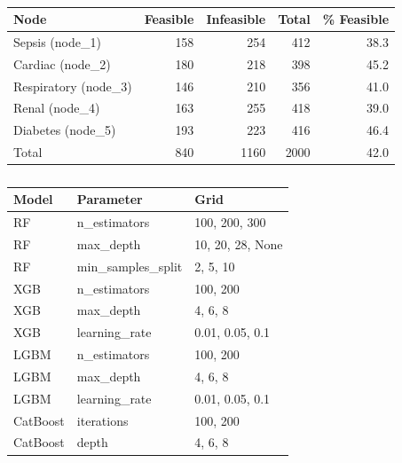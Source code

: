 
\begin{table}[h]
\begin{englishblock}
\centering
\caption{}
\begin{tabular}{lrrrr}
\toprule
Node & Feasible & Infeasible & Total & \% Feasible \\
\midrule
Sepsis (node\_1) & 158 & 254 & 412 & 38.3 \\
Cardiac (node\_2) & 180 & 218 & 398 & 45.2 \\
Respiratory (node\_3) & 146 & 210 & 356 & 41.0 \\
Renal (node\_4) & 163 & 255 & 418 & 39.0 \\
Diabetes (node\_5) & 193 & 223 & 416 & 46.4 \\
\midrule
Total & 840 & 1160 & 2000 & 42.0 \\
\bottomrule
\end{tabular}
\label{tab:class_imbalance}
\end{englishblock}
\end{table}

\begin{table}[h]
\begin{englishblock}
\centering
\caption{}
\begin{tabular}{lll}
\toprule
Model & Parameter & Grid \\
\midrule
RF & n\_estimators & 100, 200, 300 \\
RF & max\_depth & 10, 20, 28, None \\
RF & min\_samples\_split & 2, 5, 10 \\
XGB & n\_estimators & 100, 200 \\
XGB & max\_depth & 4, 6, 8 \\
XGB & learning\_rate & 0.01, 0.05, 0.1 \\
LGBM & n\_estimators & 100, 200 \\
LGBM & max\_depth & 4, 6, 8 \\
LGBM & learning\_rate & 0.01, 0.05, 0.1 \\
CatBoost & iterations & 100, 200 \\
CatBoost & depth & 4, 6, 8 \\
\bottomrule
\end{tabular}
\label{tab:hyperparam_grids}
\end{englishblock}
\end{table}

